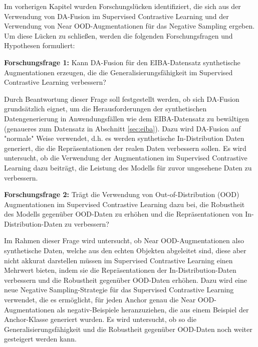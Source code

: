 Im vorherigen Kapitel wurden Forschungslücken identifiziert, die sich aus der Verwendung von DA-Fusion im Supervised Contrastive Learning und der Verwendung von Near OOD-Augmentationen für das Negative Sampling ergeben. Um diese Lücken zu schließen, werden die folgenden Forschungsfragen und Hypothesen formuliert:

\textbf{Forschungsfrage 1:} Kann DA-Fusion für den EIBA-Datensatz synthetische Augmentationen erzeugen, die die Generalisierungsfähigkeit im Supervised Contrastive Learning verbessern?

Durch Beantwortung dieser Frage soll festgestellt werden, ob sich DA-Fusion grundsätzlich eignet, um die Herausforderungen der synthetischen Datengenerierung in Anwendungsfällen wie dem EIBA-Datensatz zu bewältigen (genaueres zum Datensatz in Abschnitt \ref{sec:eiba}). Dazu wird DA-Fusion auf "normale" Weise verwendet, d.h. es werden synthetische In-Distribution Daten generiert, die die Repräsentationen der realen Daten verbessern sollen. Es wird untersucht, ob die Verwendung der Augmentationen im Supervised Contrastive Learning dazu beiträgt, die Leistung des Modells für zuvor ungesehene Daten zu verbessern.


\textbf{Forschungsfrage 2:} Trägt die Verwendung von Out-of-Distribution (OOD) Augmentationen im Supervised Contrastive Learning dazu bei, die Robustheit des Modells gegenüber OOD-Daten zu erhöhen und die Repräsentationen von In-Distribution-Daten zu verbessern?

Im Rahmen dieser Frage wird untersucht, ob Near OOD-Augmentationen \textemdash also synthetische Daten, welche aus den echten Objekten abgeleitet sind, diese aber nicht akkurat darstellen müssen \textemdash im Supervised Contrastive Learning einen Mehrwert bieten, indem sie die Repräsentationen der In-Distribution-Daten verbessern und die Robustheit gegenüber OOD-Daten erhöhen. Dazu wird eine neue Negative Sampling-Strategie für das Supervised Contrastive Learning verwendet, die es ermöglicht, für jeden Anchor genau die Near OOD-Augmentationen als negativ-Beispiele heranzuziehen, die aus einem Beispiel der Anchor-Klasse generiert wurden. Es wird untersucht, ob so die Generalisierungsfähigkeit und die Robustheit gegenüber OOD-Daten noch weiter gesteigert werden kann.

